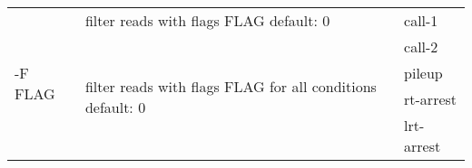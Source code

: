 {\small
\begin{tabular}{@{}p{}p{}l@{}}
\multirow{5}{=}{-F FLAG} & filter reads with flags FLAG
default: 0 & call-1 \\
 & \multirow{4}{=}{filter reads with flags FLAG for all conditions
default: 0} & call-2 \\
 & & pileup \\
 & & rt-arrest \\
 & & lrt-arrest \\
\end{tabular}\\
}
